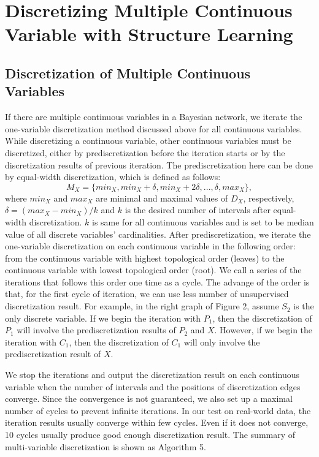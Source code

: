 \section{Discretizing Multiple Continuous Variable with Structure Learning}
\label{DMC_SL}
\subsection{Discretization of Multiple Continuous Variables}
\label{DMC}
If there are multiple continuous variables in a Bayesian network, we iterate the one-variable discretization method discussed above for all continuous variables. While discretizing a continuous variable, other continuous variables must be discretized, either by prediscretization before the iteration starts or by the discretization results of previous iteration. The prediscretization here can be done by equal-width discretization, which is defined as follows:
\begin{equation}
M_X =  \{ min_X, min_X + \delta, min_X + 2\delta, ..., \delta, max_X \},
\end{equation}
where $min_X$ and $max_X$ are minimal and maximal values of $D_X$, respectively, $\delta =  (max_X - min_X)/k$ and $k$ is the desired number of intervals after equal-width discretization. $k$ is same for all continuous variables and is set to be median value of all discrete variables' cardinalities. After prediscretization, we iterate the one-variable discretization on each continuous variable in the following order: from the continuous variable with highest topological order (leaves) to the continuous variable with lowest topological order (root). We call a series of the iterations that follows this order one time as a cycle. The advange of the order is that, for the first cycle of iteration, we can use less number of unsupervised discretization result. For example, in the right graph of Figure 2, assume $S_2$ is the only discrete variable. If we begin the iteration with $P_1$, then the discretization of $P_1$ will involve the prediscretization results of $P_2$ and $X$. However, if we begin the iteration with $C_1$, then the discretization of $C_1$ will only involve the prediscretization result of $X$.

We stop the iterations and output the discretization result on each continuous variable when the number of intervals and the positions of discretization edges converge. Since the convergence is not guaranteed, we also set up a maximal number of cycles to prevent infinite iterations. In our test on real-world data, the iteration results usually converge within few cycles. Even if it does not converge, 10 cycles usually produce good enough discretization result. The summary of multi-variable discretization is shown as Algorithm 5.


